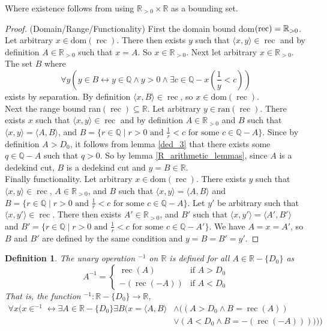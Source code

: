 \documentclass{report}
\newtheorem{definition}[theo]{Definition}
\begin{document}
\noindent Where existence follows from using $\mathbb R_{>0}\times\mathbb R$ as a bounding set.
\begin{proof}(Domain/Range/Functionality)
First the domain bound dom$(\operatorname{rec})=\\\mathbb R_{>0}$. Let arbitrary $x\in\text{dom}(\operatorname{rec})$. There then exists $y$ such
that $\langle x,y\rangle\in\operatorname{rec}$ and by definition
$A\in\mathbb R_{>0}$ such that $x=A$. So $x\in\mathbb R_{>0}$. Next let arbitrary $x\in\mathbb R_{>0}$. The set $B$ where
\begin{equation*}
\forall y\left(y\in B\leftrightarrow y\in\mathbb Q\land y>0\land\exists c\in\mathbb Q-x\left(\frac{1}{y}<c\right)\right)
\end{equation*}
exists by separation. By definition $\langle x,B\rangle\in\operatorname{rec}$, so $x\in\text{dom}(\operatorname{rec})$.\\
\indent Next the range bound ran$(\operatorname{rec})\subseteq\mathbb R$.
Let arbitrary $y\in\text{ran}(\operatorname{rec})$. There exists $x$ such that $\langle x,y\rangle\in\operatorname{rec}$ and by definition
$A\in\mathbb R_{>0}$ and $B$ such that $\langle x,y\rangle=\langle A,B\rangle$, and 
$B=\{r\in\mathbb Q\mid r>0\text{ and }\frac{1}{r}<c\text{ for some }c\in\mathbb Q-A\}$. Since by definition $A>D_0$, it follows from
lemma \ref{ded_3} that there exists some $q\in\mathbb Q-A$ such that $q>0$. So by lemma \ref{R_arithmetic_lemmas}, since $A$ is a dedekind cut, $B$ is a dedekind cut and $y=B\in\mathbb R$.\\
\indent Finally functionality. Let arbitrary $x\in\text{dom}(\operatorname{rec})$. There exists $y$ such that 
$\langle x,y\rangle\in\operatorname{rec}$, $A\in\mathbb R_{>0}$, and $B$ such that $\langle x,y\rangle=\langle A,B\rangle$ and
$B=\{r\in\mathbb Q\mid r>0\text{ and }\frac{1}{r}<c\text{ for some }c\in\mathbb Q-A\}$.
Let $y'$ be arbitrary such that $\langle x,y'\rangle\in\operatorname{rec}$. There then exists $A'\in\mathbb R_{>0}$, and $B'$ such that 
$\langle x,y'\rangle=\langle A',B'\rangle$ and
$B'=\{r\in\mathbb Q\mid r>0\text{ and }\frac{1}{r}<c\text{ for some }c\in\mathbb Q-A'\}$. We have $A=x=A'$, so $B$ and $B'$ are defined by the 
same condition and $y=B=B'=y'$.
\end{proof}
\begin{definition}
The unary operation $^{-1}$ on $\mathbb R$ is defined for all $A\in\mathbb R-\{D_0\}$ as 
\begin{equation*}
A^{-1}=
\begin{cases}
\operatorname{rec}(A)&\text{if }A>D_0\\
-(\operatorname{rec}(-A))&\text{if }A<D_0
\end{cases}
\end{equation*}
That is, the function $^{-1}:\mathbb R-\{D_0\}\to\mathbb R$,
\begin{align*}
\forall x(x\in ^{-1}\leftrightarrow\exists A\in\mathbb R-\{D_0\}\exists B(x=\langle A,B\rangle&\land(
(A>D_0\land B=\operatorname{rec}(A))\\
&\lor(A<D_0\land B=-(\operatorname{rec}(-A))))))
\end{align*}
\end{definition}
\end{document}
